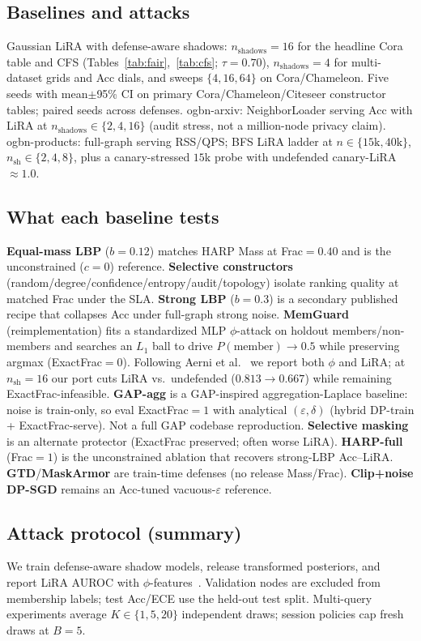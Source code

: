 \documentclass[conference]{IEEEtran}
\begin{document}
\subsection{Baselines and attacks}
Gaussian LiRA with defense-aware shadows: $n_{\mathrm{shadows}}{=}16$ for the headline Cora table and CFS (Tables~\ref{tab:fair},~\ref{tab:cfs}; $\tau{=}0.70$), $n_{\mathrm{shadows}}{=}4$ for multi-dataset grids and Acc dials, and sweeps $\{4,16,64\}$ on Cora/Chameleon.
Five seeds with mean$\pm$95\% CI on primary Cora/Chameleon/Citeseer constructor tables; paired seeds across defenses.
ogbn-arxiv: NeighborLoader serving Acc with LiRA at $n_{\mathrm{shadows}}{\in}\{2,4,16\}$ (audit stress, not a million-node privacy claim).
ogbn-products: full-graph serving RSS/QPS; BFS LiRA ladder at $n{\in}\{15\text{k},40\text{k}\}$, $n_{\mathrm{sh}}{\in}\{2,4,8\}$, plus a canary-stressed $15$k probe with undefended canary-LiRA ${\approx}1.0$.

\subsection{What each baseline tests}
\textbf{Equal-mass LBP} ($b{=}0.12$) matches HARP Mass at Frac${=}0.40$ and is the unconstrained ($c{=}0$) reference.
\textbf{Selective constructors} (random/degree/confidence/entropy/audit/topology) isolate ranking quality at matched Frac under the SLA.
\textbf{Strong LBP} ($b{=}0.3$) is a secondary published recipe that collapses Acc under full-graph strong noise.
\textbf{MemGuard} (reimplementation) fits a standardized MLP $\phi$-attack on holdout members/non-members and searches an $L_1$ ball to drive $P(\mathrm{member})\rightarrow 0.5$ while preserving argmax (ExactFrac${=}0$).
Following Aerni et al.~\cite{aerni2024misleading} we report both $\phi$ and LiRA; at $n_{\mathrm{sh}}{=}16$ our port cuts LiRA vs.\ undefended ($0.813\rightarrow 0.667$) while remaining ExactFrac-infeasible.
\textbf{GAP-agg} is a GAP-inspired aggregation-Laplace baseline: noise is train-only, so eval ExactFrac${=}1$ with analytical $(\varepsilon,\delta)$ (hybrid DP-train + ExactFrac-serve). Not a full GAP codebase reproduction.
\textbf{Selective masking} is an alternate protector (ExactFrac preserved; often worse LiRA).
\textbf{HARP-full} (Frac${=}1$) is the unconstrained ablation that recovers strong-LBP Acc--LiRA.
\textbf{GTD}/\textbf{MaskArmor} are train-time defenses (no release Mass/Frac).
\textbf{Clip{+}noise DP-SGD} remains an Acc-tuned vacuous-$\varepsilon$ reference.

\subsection{Attack protocol (summary)}
We train defense-aware shadow models, release transformed posteriors, and report LiRA AUROC with $\phi$-features~\cite{carlini2022membership,salem2019mlleaks}.
Validation nodes are excluded from membership labels; test Acc/ECE use the held-out test split.
Multi-query experiments average $K\in\{1,5,20\}$ independent draws; session policies cap fresh draws at $B{=}5$.
\end{document}
